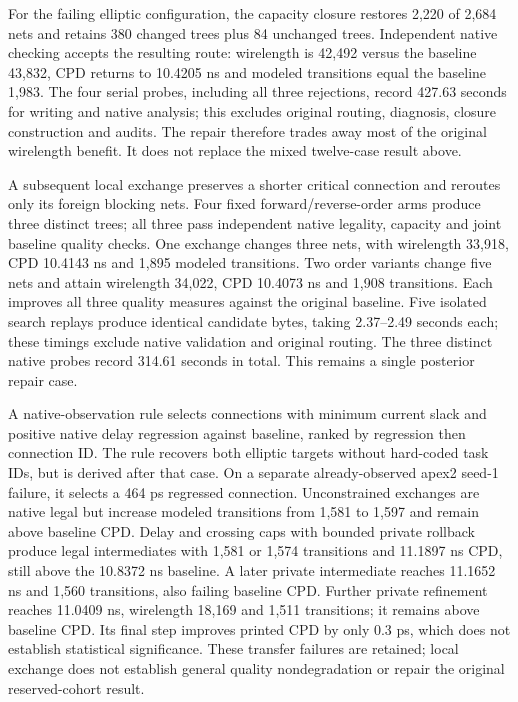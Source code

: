 \documentclass[10pt]{article}
\begin{document}
For the failing elliptic configuration, the capacity closure restores 2,220
of 2,684 nets and retains 380 changed trees plus 84 unchanged trees.
Independent native checking accepts the resulting route: wirelength is
42,492 versus the baseline 43,832, CPD returns to 10.4205 ns and modeled
transitions equal the baseline 1,983. The four serial probes, including
all three rejections, record 427.63 seconds for writing and native analysis;
this excludes original routing, diagnosis, closure construction and audits.
The repair therefore trades away most of the original wirelength benefit.
It does not replace the mixed twelve-case result above.

A subsequent local exchange preserves a shorter critical connection and
reroutes only its foreign blocking nets. Four fixed forward/reverse-order
arms produce three distinct trees; all three pass independent native legality,
capacity and joint baseline quality checks. One exchange changes three nets,
with wirelength 33,918, CPD 10.4143 ns and 1,895 modeled transitions.
Two order variants change five nets and attain wirelength 34,022,
CPD 10.4073 ns and 1,908 transitions. Each improves all three quality measures
against the original baseline. Five isolated search replays produce identical
candidate bytes, taking 2.37--2.49 seconds each; these timings exclude native
validation and original routing. The three distinct native probes record
314.61 seconds in total. This remains a single posterior repair case.

A native-observation rule selects connections with minimum current slack and
positive native delay regression against baseline, ranked by regression then
connection ID. The rule recovers both elliptic targets without hard-coded task
IDs, but is derived after that case. On a separate already-observed apex2
seed-1 failure, it selects a 464 ps regressed connection. Unconstrained exchanges
are native legal but increase modeled transitions from 1,581 to 1,597 and
remain above baseline CPD. Delay and crossing caps with bounded private rollback
produce legal intermediates with 1,581 or 1,574 transitions and 11.1897 ns CPD,
still above the 10.8372 ns baseline. A later private intermediate reaches
11.1652 ns and 1,560 transitions, also failing baseline CPD. Further private
refinement reaches 11.0409 ns, wirelength 18,169 and 1,511 transitions; it
remains above baseline CPD. Its final step improves printed CPD by only
0.3 ps, which does not establish statistical significance. These transfer
failures are retained; local exchange does not establish general quality
nondegradation or repair the original reserved-cohort result.
\end{document}
